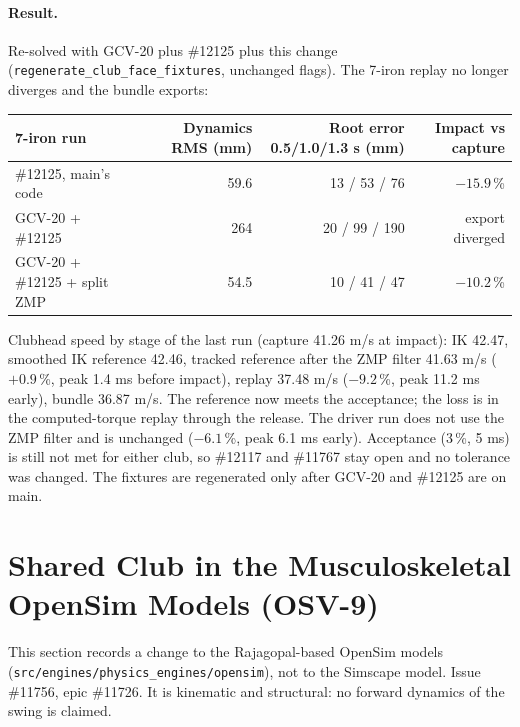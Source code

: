 \documentclass[11pt,a4paper]{article}
\begin{document}
\paragraph{Result.} Re-solved with GCV-20 plus \#12125 plus this change
(\texttt{regenerate\_club\_face\_fixtures}, unchanged flags). The 7-iron
replay no longer diverges and the bundle exports:
\begin{center}
\begin{tabular}{@{}lrrr@{}}
\toprule
7-iron run & Dynamics RMS (mm) & Root error 0.5/1.0/1.3 s (mm) & Impact vs capture \\
\midrule
\#12125, main's code & 59.6 & 13 / 53 / 76 & $-15.9$\,\% \\
GCV-20 + \#12125 & 264 & 20 / 99 / 190 & export diverged \\
GCV-20 + \#12125 + split ZMP & 54.5 & 10 / 41 / 47 & $-10.2$\,\% \\
\bottomrule
\end{tabular}
\end{center}
Clubhead speed by stage of the last run (capture 41.26 m/s at impact): IK
42.47, smoothed IK reference 42.46, tracked reference after the ZMP filter
41.63 m/s ($+0.9$\,\%, peak 1.4 ms before impact), replay 37.48 m/s
($-9.2$\,\%, peak 11.2 ms early), bundle 36.87 m/s. The reference now meets
the acceptance; the loss is in the computed-torque replay through the
release. The driver run does not use the ZMP filter and is unchanged
($-6.1$\,\%, peak 6.1 ms early). Acceptance (3\,\%, 5 ms) is still not met
for either club, so \#12117 and \#11767 stay open and no tolerance was
changed. The fixtures are regenerated only after GCV-20 and \#12125 are on
main.

\section{Shared Club in the Musculoskeletal OpenSim Models (OSV-9)}
This section records a change to the Rajagopal-based OpenSim models
(\texttt{src/engines/physics\_engines/opensim}), not to the Simscape model.
Issue \#11756, epic \#11726. It is kinematic and structural: no forward
dynamics of the swing is claimed.
\end{document}
